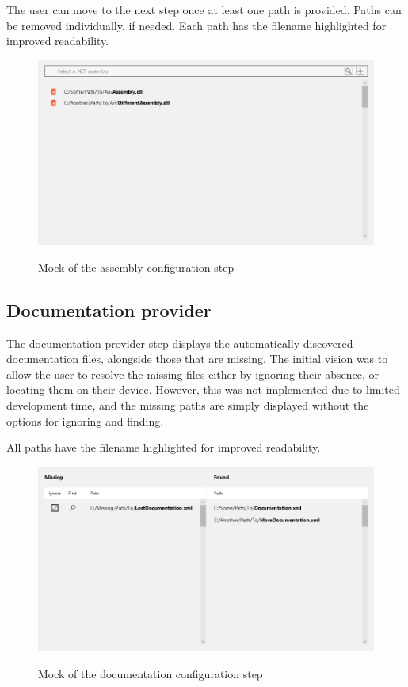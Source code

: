 The user can move to the next step once at least one path is provided. Paths can be removed individually, if needed. Each path has the filename highlighted for improved readability.

\begin{figure}[H]
    \includegraphics[width=\linewidth]{img/mockMember provider.png}
    \label{fig:pluginMember}
    \caption{Mock of the assembly configuration step}
\end{figure}

\pagebreak
\subsection{Documentation provider}

The documentation provider step displays the automatically discovered documentation files, alongside those that are missing. The initial vision was to allow the user to resolve the missing files either by ignoring their absence, or locating them on their device. However, this was not implemented due to limited development time, and the missing paths are simply displayed without the options for ignoring and finding.

All paths have the filename highlighted for improved readability.

\begin{figure}[H]
    \includegraphics[width=\linewidth]{img/mockDocumentation provider.png}
    \label{fig:pluginDocumentation}
    \caption{Mock of the documentation configuration step}
\end{figure}

